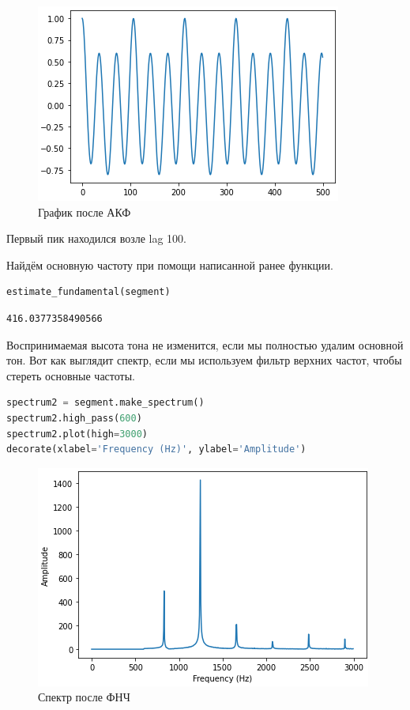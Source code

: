 \begin{figure}[H]
	\begin{center}
		\includegraphics[scale=1]{fig/lab05/lab5_9.png}
		\caption{График после АКФ}
	\end{center}
\end{figure}

Первый пик находился возле lag 100.

Найдём основную частоту при помощи написанной ранее функции.

\begin{lstlisting}[language=Python]
estimate_fundamental(segment)
\end{lstlisting}

\begin{lstlisting}
416.0377358490566
\end{lstlisting}

Воспринимаемая высота тона не изменится, если мы полностью удалим основной тон. Вот как выглядит спектр, если мы используем фильтр верхних частот, чтобы стереть основные частоты.

\begin{lstlisting}[language=Python]
spectrum2 = segment.make_spectrum()
spectrum2.high_pass(600)
spectrum2.plot(high=3000)
decorate(xlabel='Frequency (Hz)', ylabel='Amplitude')
\end{lstlisting}

\begin{figure}[H]
	\begin{center}
		\includegraphics[scale=1]{fig/lab05/lab5_10.png}
		\caption{Спектр после ФНЧ}
	\end{center}
\end{figure}

